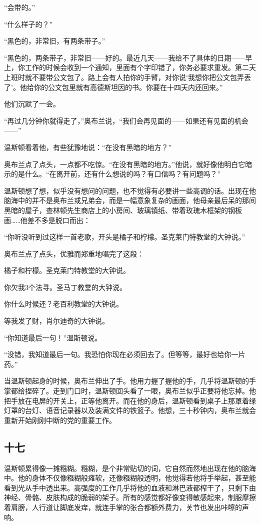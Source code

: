 ``会带的。''

``什么样子的？''

``黑色的，非常旧，有两条带子。''

``黑色的，两条带子，非常旧------好的。最近几天------我给不了具体的日期------早上，你工作的时候会收到一个通知，里面有个字印错了，你务必要求重发。第二天上班时就不要带公文包了。路上会有人拍你的手臂，对你说`我想你把公文包弄丢了'。他给你的公文包里就有高德斯坦因的书。你要在十四天内还回来。''

他们沉默了一会。

``再过几分钟你就得走了，''奥布兰说，``我们会再见面的------如果还有见面的机会------''

温斯顿看着他，有些犹豫地说：``在没有黑暗的地方？''

奥布兰点了点头，一点都不吃惊。``在没有黑暗的地方。''他说，就好像他明白它暗示的是什么。``在离开前，还有什么想说的吗？有口信吗？有问题吗？''

温斯顿想了想，似乎没有想问的问题，也不觉得有必要讲一些高调的话。出现在他脑海中的并不是奥布兰或兄弟会，而是一幅意象复杂的画面，他母亲最后呆的那间黑暗的屋子，查林顿先生商店上的小房间、玻璃镇纸、带着玫瑰木框架的钢板画\ldots\ldots 他差不多是脱口而出：

``你听没听到过这样一首老歌，开头是橘子和柠檬。圣克莱门特教堂的大钟说。''

奥布兰点了点头，优雅而郑重地唱完了这段：

橘子和柠檬。圣克莱门特教堂的大钟说。

你欠我3个法寻。圣马丁教堂的大钟说。

你什么时候还？老百利教堂的大钟说。

等我发了财，肖尔迪奇的大钟说。

``你知道最后一句！''温斯顿说。

``没错，我知道最后一句。我恐怕你现在必须回去了。但等等，最好也给你一片药。''

当温斯顿起身的时候，奥布兰伸出了手。他用力握了握他的手，几乎将温斯顿的手掌都给捏碎了。走到门口时，温斯顿回头看了一眼，奥布兰似乎正要将他忘掉。他把手放在电屏的开关上，正等他离开。而在他的身后，温斯顿看到桌子上那罩着绿灯罩的台灯、语音记录器以及装满文件的铁篮子。他想，三十秒钟内，奥布兰就会重新开始刚刚中断的党的重要工作。

\subsection{十七}\label{ux5341ux4e03}

温斯顿累得像一摊糨糊。糨糊，是个非常贴切的词，它自然而然地出现在他的脑海中。他的身体不仅像糨糊般瘫软，还像糨糊般透明，他觉得若他将手举起，甚至能看到光从手中透出来。高强度的工作几乎将他的血液和淋巴液都榨干了，只剩下由神经、骨骼、皮肤构成的脆弱的架子。所有的感觉都好像变得敏感起来，制服摩擦着肩膀，人行道让脚底发痒，就连手掌的张合都额外费力，关节也发出咔嚓的声响。

